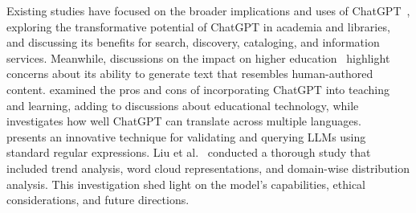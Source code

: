 Existing studies have focused on the broader implications and uses of ChatGPT~\cite{lund2023chatting}, exploring the transformative potential of ChatGPT in academia and libraries, and discussing its benefits for search, discovery, cataloging, and information services. Meanwhile, discussions on the impact on higher education~\cite{rudolph2023chatgpt} highlight concerns about its ability to generate text that resembles human-authored content.\cite{baidoo2023education} examined the pros and cons of incorporating ChatGPT into teaching and learning, adding to discussions about educational technology, while~\cite{jiao2023chatgpt} investigates how well ChatGPT can translate across multiple languages. ~\cite{kuchnik2023validating} presents an innovative technique for validating and querying LLMs using standard regular expressions. Liu et al.~\cite{liu2023summary} conducted a thorough study that included trend analysis, word cloud representations, and domain-wise distribution analysis. This investigation shed light on the model's capabilities, ethical considerations, and future directions. \par


